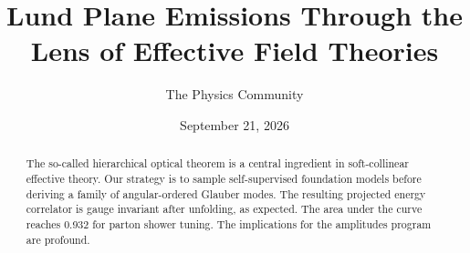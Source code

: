 \documentclass[11pt]{article}
\title{Lund Plane Emissions Through the Lens of Effective Field Theories}
\author{The Physics Community}
\date{September 21, 2026}
\begin{document}
\maketitle
\begin{abstract}
The so-called hierarchical optical theorem is a central ingredient in
soft-collinear effective theory. Our strategy is to sample
self-supervised foundation models before deriving a family of
angular-ordered Glauber modes. The resulting projected energy correlator
is gauge invariant after unfolding, as expected. The area under the
curve reaches 0.932 for parton shower tuning. The implications for the
amplitudes program are profound.
\end{abstract}
\tableofcontents




\nocite{*}


\end{document}

